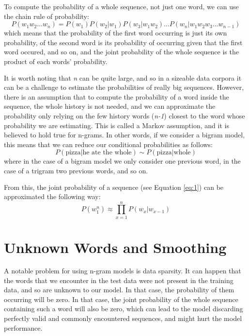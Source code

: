 To compute the probability of a whole sequence, not just one word, we can use the chain rule of probability:
\begin{equation}
    P(w_1w_2...w_n) = P(w_1)P(w_2|w_1)P(w_3|w_1w_2)...P(w_n|w_1w_2w_3...w_{n-1})\label{eq:1}
\end{equation}
which means that the probability of the first word occurring is just its own probability, of the second word is its probability of occurring given that the first word occured, and so on, and the joint probability of the whole sequence is the product of each words' probability.

It is worth noting that \textit{n} can be quite large, and so in a sizeable data corpora it can be a challenge to estimate the probabilities of really big sequences. However, there is an assumption that to compute the probability of a word inside the sequence, the whole history is not needed, and we can approximate the probability only relying on the few history words (\textit{n-1}) closest to the word whose probability we are estimating. This is called a Markov assumption, and it is believed to hold true for n-grams. In other words, if we consider a bigram model, this means that we can reduce our conditional probabilities as follows:
\begin{equation}
    P(\text{pizza}|\text{he ate the whole}) \sim P(\text{pizza}|\text{whole})
\end{equation}
where in the case of a bigram model we only consider one previous word, in the case of a trigram two previous words, and so on.

From this, the joint probability of a sequence (see Equation \ref{eq:1}) can be approximated the following way:
\begin{equation}
    P(w_1^n) \approx \prod_{x=1}^n P(w_x|w_{x-1})
\end{equation}

\section{Unknown Words and Smoothing}
\label{sec:NgramBackground-Smoothing}
A notable problem for using n-gram models is data sparsity. It can happen that the words that we encounter in the test data were not present in the training data, and so are unknown to our model. In that case, the probability of them occurring will be zero. In that case, the joint probability of the whole sequence containing such a word will also be zero, which can lead to the model discarding perfectly valid and commonly encountered sequences, and might hurt the model performance.

